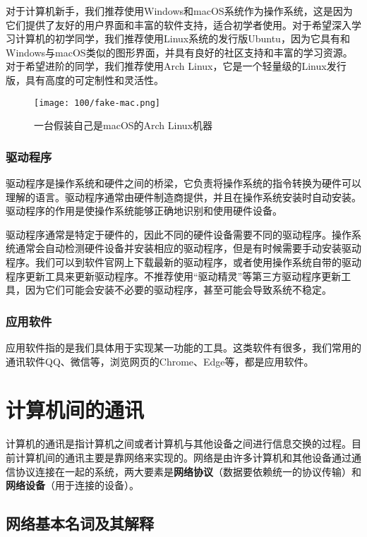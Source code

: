 对于计算机新手，我们推荐使用Windows和macOS系统作为操作系统，这是因为它们提供了友好的用户界面和丰富的软件支持，适合初学者使用。对于希望深入学习计算机的初学同学，我们推荐使用Linux系统的发行版Ubuntu，因为它具有和Windows与macOS类似的图形界面，并具有良好的社区支持和丰富的学习资源。对于希望进阶的同学，我们推荐使用Arch Linux，它是一个轻量级的Linux发行版，具有高度的可定制性和灵活性。

\begin{figure}[ht]
  \centering
  \texttt{[image: 100/fake-mac.png]}
  \caption{一台假装自己是macOS的Arch Linux机器}
\end{figure}

\subsubsection{驱动程序}

驱动程序是操作系统和硬件之间的桥梁，它负责将操作系统的指令转换为硬件可以理解的语言。驱动程序通常由硬件制造商提供，并且在操作系统安装时自动安装。驱动程序的作用是使操作系统能够正确地识别和使用硬件设备。

驱动程序通常是特定于硬件的，因此不同的硬件设备需要不同的驱动程序。操作系统通常会自动检测硬件设备并安装相应的驱动程序，但是有时候需要手动安装驱动程序。我们可以到软件官网上下载最新的驱动程序，或者使用操作系统自带的驱动程序更新工具来更新驱动程序。不推荐使用“驱动精灵”等第三方驱动程序更新工具，因为它们可能会安装不必要的驱动程序，甚至可能会导致系统不稳定。

\subsubsection{应用软件}

应用软件指的是我们具体用于实现某一功能的工具。这类软件有很多，我们常用的通讯软件QQ、微信等，浏览网页的Chrome、Edge等，都是应用软件。

\section{计算机间的通讯}

计算机的通讯是指计算机之间或者计算机与其他设备之间进行信息交换的过程。目前计算机间的通讯主要是靠网络来实现的。网络是由许多计算机和其他设备通过通信协议连接在一起的系统，两大要素是\textbf{网络协议}（数据要依赖统一的协议传输）和\textbf{网络设备}（用于连接的设备）。

\subsection{网络基本名词及其解释}

